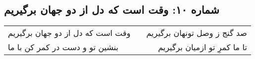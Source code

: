\begin{center}
\section*{شماره ۱۰: وقت است که دل از دو جهان برگیریم}
\label{sec:010}
\begin{longtable}{l p{0.5cm} r}
وقت است که دل از دو جهان برگیریم
&&
صد گنج ز وصل تونهان برگیریم
\\
بنشین تو و دست در کمر کن با ما
&&
تا ما کمرِ تو ازمیان برگیریم
\\
\end{longtable}
\end{center}
